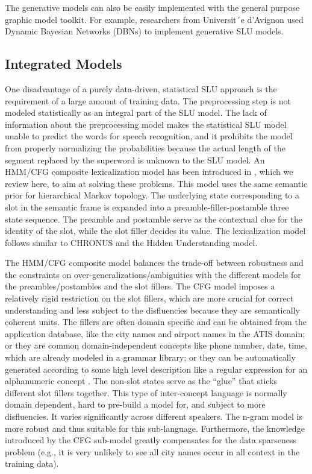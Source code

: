 The generative models can also be easily implemented with the general purpose graphic
model toolkit. For example, researchers from Universit´e d’Avignon used Dynamic Bayesian
Networks (DBNs) \cite{d1e193} to implement generative SLU models.

\subsection{Integrated Models}
One disadvantage of a purely data-driven, statistical SLU approach is the requirement
of a large amount of training data. The preprocessing step is not modeled statistically as an integral part of the SLU model. The lack of information about the preprocessing model makes the statistical SLU model unable to predict the words for speech recognition, and it prohibits the model from properly normalizing the probabilities because the actual length of the segment replaced by the superword is unknown to the SLU model. An HMM/CFG composite lexicalization model has been introduced in \cite{wang2006}, which we review here, to aim at solving these problems. This model uses the same semantic prior for hierarchical Markov topology. The underlying state corresponding to a slot in the semantic frame is expanded into a preamble-filler-postamble three state sequence. The preamble and postamble serve as the contextual clue for the identity of the
slot, while the slot filler decides its value. The lexicalization model follows similar
to CHRONUS and the Hidden Understanding model. 

The HMM/CFG composite model balances the trade-off between robustness and
the constraints on over-generalizations/ambiguities with the different models for the
preambles/postambles and the slot fillers. The CFG model imposes a relatively rigid
restriction on the slot fillers, which are more crucial for correct understanding and less
subject to the disfluencies because they are semantically coherent units. The fillers are often
domain specific and can be obtained from the application database, like the city names and
airport names in the ATIS domain; or they are common domain-independent concepts like
phone number, date, time, which are already modeled in a grammar library; or they can be
automatically generated according to some high level description like a regular expression
for an alphanumeric concept \cite{wang2006}. The non-slot states serve as the “glue”
that sticks different slot fillers together. This type of inter-concept language is normally
domain dependent, hard to pre-build a model for, and subject to more disfluencies. It varies
significantly across different speakers. The n-gram model is more robust and thus suitable
for this sub-language. Furthermore, the knowledge introduced by the CFG sub-model greatly
compensates for the data sparseness problem (e.g., it is very unlikely to see all city names
occur in all context in the training data).

